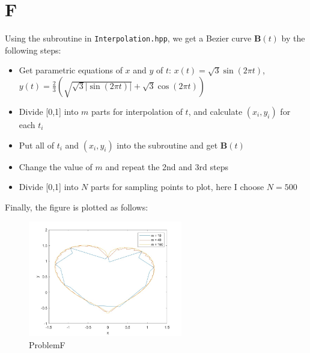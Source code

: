 \documentclass[a4paper]{article}
\begin{document}
\section*{F}
Using the subroutine in \verb|Interpolation.hpp|, we get a Bezier curve $\textbf{B}(t)$ by the following steps:
\begin{itemize}
  \item Get parametric equations of $x$ and $y$ of $t$: $x(t) = \sqrt{3}\sin(2\pi t)$, $y(t) = \frac{2}{3}(\sqrt{\sqrt{3}|\sin(2\pi t)|} + \sqrt{3} \cos(2\pi t))$
  \item Divide [0,1] into $m$ parts for interpolation of $t$, and calculate $(x_i,y_i)$ for each $t_i$
  \item Put all of $t_i$ and $(x_i,y_i)$ into the subroutine and get $\textbf{B}(t)$
  \item Change the value of $m$ and repeat the 2nd and 3rd steps
  \item Divide [0,1] into $N$ parts for sampling points to plot, here I choose $N=500$
\end{itemize}
Finally, the figure is plotted as follows:
\begin{figure}[htbp]
  \centering
  \includegraphics[width=0.6\textwidth]{fig/ProblemF.jpg}
  \caption{ProblemF}
  \label{fig:ProblemF}
\end{figure}
\end{document}
